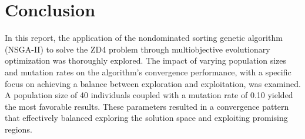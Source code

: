 \documentclass{article}
\begin{document}
\section*{Conclusion}
In this report, the application of the nondominated sorting genetic algorithm (NSGA-II) to solve the ZD4 problem through multiobjective evolutionary optimization was thoroughly explored. The impact of varying population sizes and mutation rates on the algorithm's convergence performance, with a specific focus on achieving a balance between exploration and exploitation, was examined.\\
A population size of 40 individuals coupled with a mutation rate of 0.10 yielded the most favorable results. These parameters resulted in a convergence pattern that effectively balanced exploring the solution space and exploiting promising regions.
\end{document}
